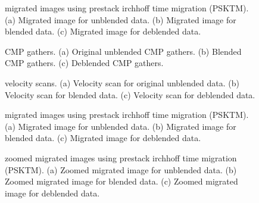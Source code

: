 \begin{figure}[htb!]
\centering
{}
\caption{ migrated images using prestack irchhoff time migration (PSKTM). (a) Migrated image for unblended data. (b) Migrated image for blended data. (c) Migrated image for deblended data.}
\label{fig:pstm,pstm-b,pstm-db}
\end{figure}

\begin{figure}[htb!]
\centering
{}
\caption{ CMP gathers. (a) Original unblended CMP gathers. (b) Blended CMP gathers. (c) Deblended CMP gathers.}
\label{fig:gulf,gulf-b,cmps-db}
\end{figure}

\begin{figure}[htb!]
\centering
{}
\caption{ velocity scans. (a) Velocity scan for original unblended data. (b) Velocity scan for blended data. (c) Velocity scan for deblended data.}
\label{fig:gulf-vscan,gulf-vscan-b,gulf-vscan-db}
\end{figure}

\begin{figure}[htb!]
\centering
{}
\caption{ migrated images using prestack irchhoff time migration (PSKTM). (a) Migrated image for unblended data. (b) Migrated image for blended data. (c) Migrated image for deblended data.}
\label{fig:gulf-pstm,gulf-pstm-b,gulf-pstm-db}
\end{figure}

\begin{figure}[htb!]
\centering
{}
\caption{ zoomed migrated images using prestack irchhoff time migration (PSKTM). (a) Zoomed migrated image for unblended data. (b) Zoomed migrated image for blended data. (c) Zoomed migrated image for deblended data.}
\label{fig:gulf-pstmzoom,gulf-pstm-bzoom,gulf-pstm-dbzoom}
\end{figure}











